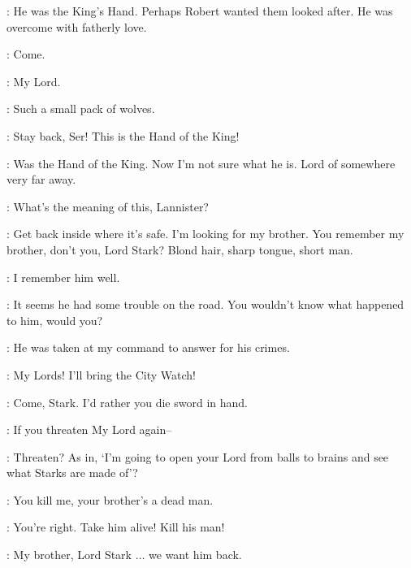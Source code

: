 \LITTLEFINGER: He was the King's Hand. Perhaps Robert wanted them looked after. He was overcome with fatherly love. 

\NED:  Come. 

\JORY: My Lord. 


\JAIME: Such a small pack of wolves. 

\JORY: Stay back, Ser! This is the Hand of the King! 

\JAIME: Was the Hand of the King. Now I'm not sure what he is. Lord of somewhere very far away. 

\LITTLEFINGER:  What's the meaning of this, Lannister? 

\JAIME: Get back inside where it's safe. I'm looking for my brother. You remember my brother, don't you, Lord Stark? Blond hair, sharp tongue, short man. 

\NED: I remember him well. 

\JAIME: It seems he had some trouble on the road. You wouldn't know what happened to him, would you? 

\NED: He was taken at my command to answer for his crimes. 


\LITTLEFINGER: My Lords! I'll bring the City Watch! 

\JAIME: Come, Stark. I'd rather you die sword in hand. 

\JORY: If you threaten My Lord again-- 

\JAIME: Threaten? As in, `I'm going to open your Lord from balls to brains and see what Starks are made of'? 

\NED: You kill me, your brother's a dead man. 

\JAIME: You're right.  Take him alive! Kill his man! 


\JAIME: My brother, Lord Stark $\ldots$ we want him back. 



